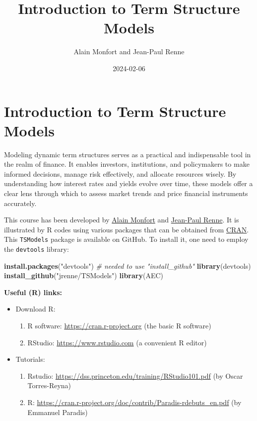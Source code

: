 \documentclass[
  12pt,
]{book}
\title{Introduction to Term Structure Models}
\author{Alain Monfort and Jean-Paul Renne}
\date{2024-02-06}
\newenvironment{Shaded}{\begin{snugshade}}{\end{snugshade}}
\newcommand{\CommentTok}[1]{\textcolor[rgb]{0.56,0.35,0.01}{\textit{#1}}}
\newcommand{\FunctionTok}[1]{\textcolor[rgb]{0.13,0.29,0.53}{\textbf{#1}}}
\newcommand{\NormalTok}[1]{#1}
\newcommand{\StringTok}[1]{\textcolor[rgb]{0.31,0.60,0.02}{#1}}
\providecommand{\tightlist}{%
  \setlength{\itemsep}{0pt}\setlength{\parskip}{0pt}}
\theoremstyle{definition}
\theoremstyle{definition}
\theoremstyle{definition}
\theoremstyle{definition}
\theoremstyle{remark}
\begin{document}
\maketitle

{
\setcounter{tocdepth}{1}
\tableofcontents
}
\newcommand{\bv}[1]{\mathbf{#1}}

\hypertarget{intro}{%
\chapter*{Introduction to Term Structure Models}\label{intro}}

Modeling dynamic term structures serves as a practical and indispensable tool in the realm of finance. It enables investors, institutions, and policymakers to make informed decisions, manage risk effectively, and allocate resources wisely. By understanding how interest rates and yields evolve over time, these models offer a clear lens through which to assess market trends and price financial instruments accurately.

This course has been developed by \href{https://faculty.crest.fr/amonfort/}{Alain Monfort} and \href{https://sites.google.com/site/jeanpaulrenne/home}{Jean-Paul Renne}. It is illustrated by R codes using various packages that can be obtained from \href{https://cran.r-project.org}{CRAN}. This \texttt{TSModels} package is available on GitHub. To install it, one need to employ the \texttt{devtools} library:

\begin{Shaded}
\begin{Highlighting}[]
\FunctionTok{install.packages}\NormalTok{(}\StringTok{"devtools"}\NormalTok{) }\CommentTok{\# needed to use "install\_github"}
\FunctionTok{library}\NormalTok{(devtools)}
\FunctionTok{install\_github}\NormalTok{(}\StringTok{"jrenne/TSModels"}\NormalTok{)}
\FunctionTok{library}\NormalTok{(AEC)}
\end{Highlighting}
\end{Shaded}

\textbf{Useful (R) links:}

\begin{itemize}
\item
  Download R:

  \begin{enumerate}
  \def\labelenumi{\alph{enumi}.}
  \tightlist
  \item
    R software: \url{https://cran.r-project.org} (the basic R software)
  \item
    RStudio: \url{https://www.rstudio.com} (a convenient R editor)
  \end{enumerate}
\item
  Tutorials:

  \begin{enumerate}
  \def\labelenumi{\alph{enumi}.}
  \tightlist
  \item
    Rstudio: \url{https://dss.princeton.edu/training/RStudio101.pdf} (by Oscar Torres-Reyna)
  \item
    R: \url{https://cran.r-project.org/doc/contrib/Paradis-rdebuts_en.pdf} (by Emmanuel Paradis)
  \end{enumerate}
\end{itemize}
\end{document}
